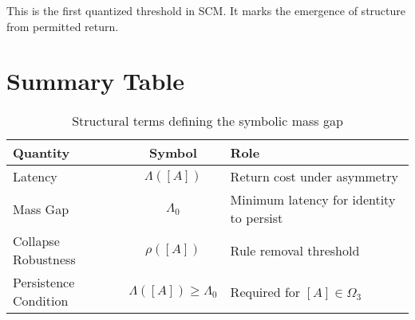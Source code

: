This is the first quantized threshold in SCM. It marks the emergence of structure from permitted return.

\section{Summary Table}

\begin{table}[h!]
\centering
\begin{tabular}{|l|c|l|}
\hline
\textbf{Quantity} & \textbf{Symbol} & \textbf{Role} \\
\hline
Latency & $\Lambda([A])$ & Return cost under asymmetry \\
Mass Gap & $\Lambda_0$ & Minimum latency for identity to persist \\
Collapse Robustness & $\rho([A])$ & Rule removal threshold \\
Persistence Condition & $\Lambda([A]) \geq \Lambda_0$ & Required for $[A] \in \Omega_3$ \\
\hline
\end{tabular}
\caption{Structural terms defining the symbolic mass gap}
\end{table}
